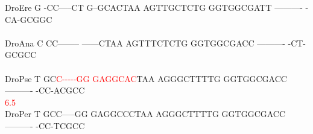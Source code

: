 \documentclass[11pt,twoside,reqno,a4paper]{article}
\begin{document}
{DroEre	G	-CC-----CT	G--GCACTAA	AGTTGCTCTG	GGTGGCGATT	----------	-CA-GCGGC\\
\hspace*{7\charwidth}\hspace*{1\charwidth}\hspace*{1\charwidth}\hspace*{1\charwidth}\hspace*{1\charwidth}\hspace*{1\charwidth}\hspace*{1\charwidth}\\
DroAna	C	CC--------	------CTAA	AGTTTCTCTG	GGTGGCGACC	----------	-CT-GCGCC\\
\hspace*{7\charwidth}\hspace*{1\charwidth}\hspace*{1\charwidth}\hspace*{1\charwidth}\hspace*{1\charwidth}\hspace*{1\charwidth}\hspace*{1\charwidth}\\
DroPse	T	GC\textcolor{Red}{C}\textcolor{Red}{-}\textcolor{Red}{-}\textcolor{Red}{-}\textcolor{Red}{-}\textcolor{Red}{-}\textcolor{Red}{G}\textcolor{Red}{G}	\textcolor{Red}{G}\textcolor{Red}{A}\textcolor{Red}{G}\textcolor{Red}{G}\textcolor{Red}{C}\textcolor{Red}{A}\textcolor{Red}{C}TAA	AGGGCTTTTG	GGTGGCGACC	----------	-CC-ACGCC\\
\hspace*{7\charwidth}\hspace*{1\charwidth}\hspace*{3\charwidth}\textcolor{Red}{6.5}\hspace*{1\charwidth}\hspace*{1\charwidth}\hspace*{1\charwidth}\hspace*{1\charwidth}\hspace*{1\charwidth}\\
DroPer	T	GCC-----GG	GAGGCCCTAA	AGGGCTTTTG	GGTGGCGACC	----------	-CC-TCGCC\\
\hspace*{7\charwidth}\hspace*{1\charwidth}\hspace*{1\charwidth}\hspace*{1\charwidth}\hspace*{1\charwidth}\hspace*{1\charwidth}\hspace*{1\charwidth}\\
}
\end{document}

